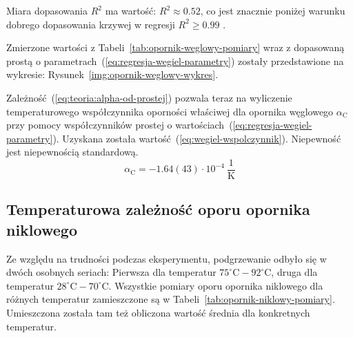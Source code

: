 \documentclass[twocolumn, a4paper, polish, 10pt]{article}
\begin{document}
Miara dopasowania $R^2$ ma wartość: $R^2 \approx 0.52$, co jest znacznie poniżej warunku dobrego dopasowania krzywej w regresji $R^2 \geq 0.99$ \cite{epa-8000d}.

Zmierzone wartości z Tabeli~\ref{tab:opornik-weglowy-pomiary} wraz z dopasowaną prostą o parametrach~(\ref{eq:regresja-wegiel-parametry}) zostały przedstawione na wykresie: Rysunek~\ref{img:opornik-weglowy-wykres}.


Zależność~(\ref{eq:teoria:alpha-od-prostej}) pozwala teraz na wyliczenie temperaturowego współczynnika oporności właściwej dla opornika węglowego $\alpha_{\mathrm{C}}$ przy pomocy współczynników prostej o wartościach~(\ref{eq:regresja-wegiel-parametry}). Uzyskana została wartość~(\ref{eq:wegiel-wspolczynnik}). Niepewność jest niepewnością standardową.
\begin{equation}
    \alpha_{\mathrm{C}} = -1.64(43) \cdot 10^{-4}~\frac{1}{ \mathrm{K} }
    \label{eq:wegiel-wspolczynnik}
\end{equation}

\subsection{Temperaturowa zależność oporu opornika niklowego}
Ze względu na trudności podczas eksperymentu, podgrzewanie odbyło się w dwóch osobnych seriach: Pierwsza dla temperatur ${75^\circ\mathrm{C} - 92^\circ\mathrm{C}}$, druga dla temperatur ${28^\circ\mathrm{C} - 70^\circ\mathrm{C}}$. Wszystkie pomiary oporu opornika niklowego dla różnych temperatur zamieszczone są w Tabeli~\ref{tab:opornik-niklowy-pomiary}. Umieszczona została tam też obliczona wartość średnia dla konkretnych temperatur.
\end{document}
